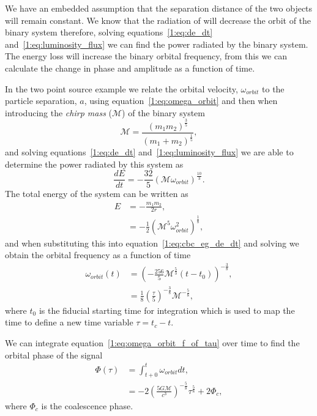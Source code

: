 We have an embedded assumption that the separation distance of the two objects will remain constant. We know that the radiation of \gws will decrease the orbit of the binary system therefore, solving equations~\ref{1:eq:de_dt} and~\ref{1:eq:luminosity_flux} we can find the power radiated by the binary system. The energy loss will increase the binary orbital frequency, from this we can calculate the change in phase and amplitude as a function of time.

In the two point source example we relate the orbital velocity, $\omega_{orbit}$ to the particle separation, $a$, using equation~\ref{1:eq:omega_orbit} and then when introducing the \textit{chirp mass} ($\mathcal{M}$) of the binary system
%
\begin{equation}
    \mathcal{M} = \frac{(m_{1}m_{2})^{\frac{3}{5}}}{(m_{1} + m_{2})^\frac{1}{5}},
\end{equation}
%
and solving equations~\ref{1:eq:de_dt} and~\ref{1:eq:luminosity_flux} we are able to determine the power radiated by this system as
%
\begin{equation}
    \frac{dE}{dt} = -\frac{32}{5}(\mathcal{M}\omega_{orbit})^\frac{10}{3}.
    \label{1:eq:cbc_eg_de_dt}
\end{equation}
%
The total energy of the system can be written as
%
\begin{align}
    E &= -\frac{m_{1}m_{2}}{2r}, \\
      &=-\frac{1}{2}(\mathcal{M}^{5} \omega^{2}_{orbit})^\frac{1}{8},
      \label{1:eq:total_energy_cbc}
\end{align}
%
and when substituting this into equation~\ref{1:eq:cbc_eg_de_dt} and solving we obtain the orbital frequency as a function of time
%
\begin{align}
    \omega_{orbit}(t) &= \left(-\frac{256}{5}\mathcal{M}^{\frac{5}{3}}(t - t_{0})\right)^{-\frac{3}{8}}, \\
                      &= \frac{1}{8}\left(\frac{\tau}{5}\right)^{-\frac{3}{8}}\mathcal{M}^{-\frac{5}{8}},
    \label{1:eq:omega_orbit_f_of_tau}
\end{align}
%
where $t_{0}$ is the fiducial starting time for integration which is used to map the time to define a new time variable $\tau = t_{c} - t$.


We can integrate equation~\ref{1:eq:omega_orbit_f_of_tau} over time to find the orbital phase of the \gwadj signal
%
\begin{align}
    \Phi(\tau) &= \int^{t}_{t+{0}} \omega_{orbit} dt, \\ 
    &= -2\left(\frac{5G\mathcal{M}}{c^{3}}\right)^{-\frac{5}{8}} \tau^{\frac{5}{8}} + 2\Phi_{c},
\end{align}
%
where $\Phi_{c}$ is the coalescence phase.

